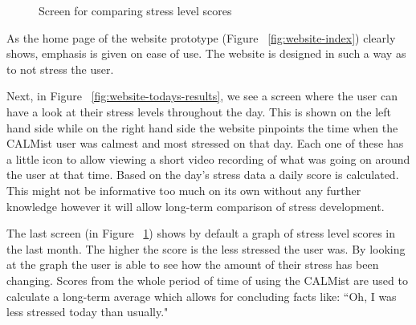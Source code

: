 \documentclass{scrartcl}
\begin{document}
\begin{figure}[htb]
	\begin{center}
			\end{center}
	\caption{Screen for comparing stress level scores}
	\label{fig:website-compare-results}
\end{figure}

As the home page of the website prototype (Figure ~\ref{fig:website-index}) clearly shows, emphasis is given on ease of use. The website is designed in such a way as to not stress the user.

Next, in Figure ~\ref{fig:website-todays-results}, we see a screen where the user can have a look at their stress levels throughout the day. This is shown on the left hand side while on the right hand side the website pinpoints the time when the CALMist user was calmest and most stressed on that day. Each one of these has a little icon to allow viewing a short video recording of what was going on around the user at that time. Based on the day's stress data a daily score is calculated. This might not be informative too much on its own without any further knowledge however it will allow long-term comparison of stress development.

The last screen (in Figure ~\ref{fig:website-compare-results}) shows by default a graph of stress level scores in the last month. The higher the score is the less stressed the user was. By looking at the graph the user is able to see how the amount of their stress has been changing. Scores from the whole period of time of using the CALMist are used to calculate a long-term average which allows for concluding facts like: ``Oh, I was less stressed today than usually."
\end{document}
